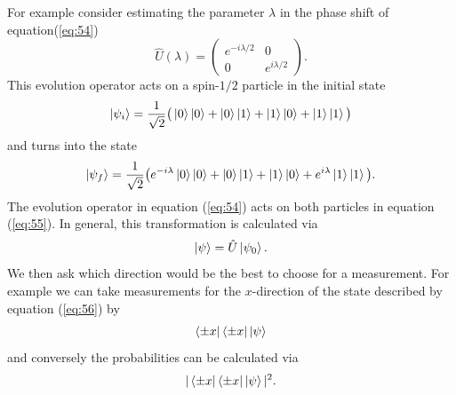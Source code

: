 \documentclass[twocolumn]{article}
\begin{document}
For example consider estimating the parameter $\lambda$ in the phase shift of equation(\ref{eq:54})
\begin{equation} \label{eq:54}
\hat{U}(\lambda)=
\begin{pmatrix}
e^{-i\lambda/2} & 0 \\
0 & e^{i\lambda/2}
\end{pmatrix}.
\end{equation}
This evolution operator acts on a spin-$1/2$ particle in the initial state
\begin{equation} \label{eq:55}
\ket{\psi_i}=\frac{1}{\sqrt{2}}\big(\ket{0}\ket{0}+\ket{0}\ket{1}+\ket{1}\ket{0}+\ket{1}\ket{1}\big)
\end{equation}
and turns into the state
\begin{equation} \label{eq:56}
\ket{\psi_f}=\frac{1}{\sqrt{2}}\big(e^{-i\lambda}\ket{0}\ket{0}+\ket{0}\ket{1}+\ket{1}\ket{0}+e^{i\lambda}\ket{1}\ket{1}\big).
\end{equation}
The evolution operator in equation (\ref{eq:54}) acts on both particles in equation (\ref{eq:55}). In general, this transformation is calculated via
\begin{equation} \label{eq:57}
\ket{\psi}=\hat{U}\ket{\psi_0}.
\end{equation}
We then ask which direction would be the best to choose for a measurement. For example we can take measurements for the $x$-direction of the state described by equation (\ref{eq:56}) by
\begin{equation} \label{eq:58}
\bra{\pm x}\bra{\pm x}\ket{\psi}
\end{equation}
and conversely the probabilities can be calculated via
\begin{equation} \label{eq:59}
|\bra{\pm x}\bra{\pm x}\ket{\psi}|^2.
\end{equation}
\end{document}
